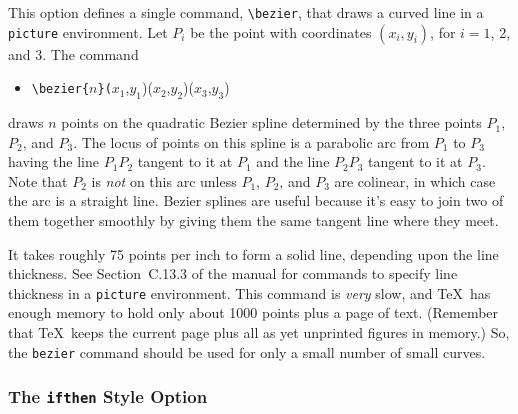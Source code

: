 This option defines a single command, \hbox{\verb|\bezier|}, that draws
a curved line in a {\tt picture} environment.  Let $P_{i}$ be the point
with coordinates $(x_{i},y_{i})$, for $i=1$, 2, and 3.  The command
\begin{itemize} \tt
\item[]
\verb|\bezier{|$n$\verb|}(|$x_{1}$,$y_{1}$)($x_{2}$,$y_{2}$)($x_{3}$,$y_{3}$)
\end{itemize}
draws $n$ points on the quadratic Bezier spline determined by the three
points $P_{1}$, $P_{2}$, and $P_{3}$.  The locus of points on this
spline is a parabolic arc from $P_{1}$ to $P_{3}$ having the line
$P_{1}P_{2}$ tangent to it at $P_{1}$ and the line $P_{2}P_{3}$ tangent
to it at $P_{3}$.  Note that $P_{2}$ is {\em not\/} on this arc unless
$P_{1}$, $P_{2}$, and $P_{3}$ are colinear, in which case the arc is a
straight line.  Bezier splines are useful because it's easy to join two
of them together smoothly by giving them the same tangent line where
they meet.

It takes roughly 75 points per inch to form a solid line, depending
upon the line thickness.  See Section~C.13.3 of the manual for commands
to specify line thickness in a {\tt picture} environment.  This command
is {\em very\/} slow, and \TeX\ has enough memory to hold only about
1000 points plus a page of text.  (Remember that \TeX\ keeps the
current page plus all as yet unprinted figures in memory.) So, the
\verb|bezier| command should be used for only a small number of small
curves.

\subsubsection{The {\tt ifthen} Style Option}

